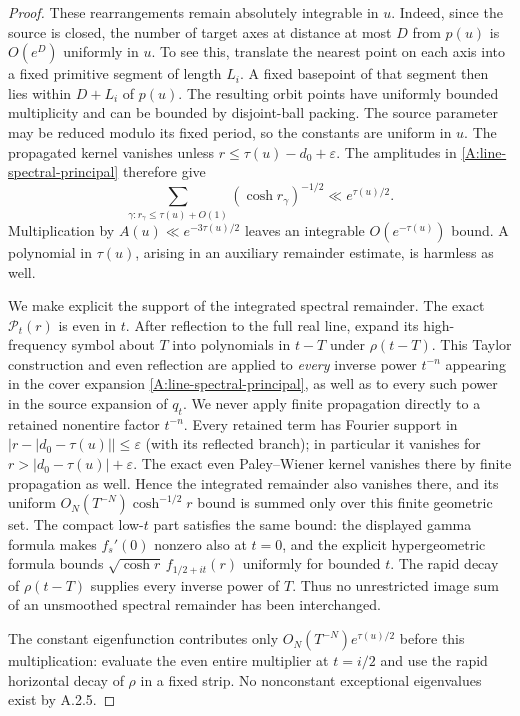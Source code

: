 \begin{proof}
These rearrangements remain absolutely integrable in $u$.
Indeed, since the source is closed, the number of target axes at
distance at most $D$ from $p(u)$ is $O(e^D)$ uniformly in $u$.
To see this, translate the nearest point on each axis into a fixed
primitive segment of length $L_i$. A fixed basepoint of that segment
then lies within $D+L_i$ of $p(u)$. The resulting orbit points have
uniformly bounded multiplicity and can be bounded by disjoint-ball
packing. The source parameter may be reduced modulo its fixed period,
so the constants are uniform in $u$.
The propagated kernel vanishes unless
$r\leq\tau(u)-d_0+\varepsilon$.
The amplitudes in \eqref{A:line-spectral-principal} therefore give
\[
 \sum_{\gamma:r_\gamma\leq\tau(u)+O(1)}
       (\cosh r_\gamma)^{-1/2}
       \ll e^{\tau(u)/2}.
\]
Multiplication by $A(u)\ll e^{-3\tau(u)/2}$ leaves an integrable
$O(e^{-\tau(u)})$ bound.
A polynomial in $\tau(u)$, arising in an auxiliary remainder
estimate, is harmless as well.

We make explicit the support of the integrated spectral remainder.
The exact $\mathcal P_t(r)$ is even in $t$.
After reflection to the full real line, expand its high-frequency
symbol about $T$ into polynomials in $t-T$ under $\rho(t-T)$.
This Taylor construction and even reflection are applied to
\emph{every} inverse power $t^{-n}$ appearing in the cover
expansion \eqref{A:line-spectral-principal}, as well as to every
such power in the source expansion of $q_t$.
We never apply finite propagation directly to a retained
nonentire factor $t^{-n}$.
Every retained term has Fourier support in
$|r-|d_0-\tau(u)||\leq\varepsilon$ (with its reflected branch);
in particular it vanishes for
$r>|d_0-\tau(u)|+\varepsilon$.
The exact even Paley--Wiener kernel vanishes there by finite
propagation as well. Hence the integrated remainder also vanishes
there, and its uniform
$O_N(T^{-N})\cosh^{-1/2}r$ bound is summed only over this finite
geometric set. The compact low-$t$ part satisfies the same bound:
the displayed gamma formula makes $f_s'(0)$ nonzero also at $t=0$,
and the explicit hypergeometric formula bounds
$\sqrt{\cosh r}\,f_{1/2+it}(r)$ uniformly for bounded $t$.
The rapid decay of $\rho(t-T)$ supplies every inverse power of $T$.
Thus no unrestricted image sum of an unsmoothed spectral remainder
has been interchanged.

The constant eigenfunction contributes only
$O_N(T^{-N})e^{\tau(u)/2}$ before this multiplication:
evaluate the even entire multiplier at $t=i/2$ and use the
rapid horizontal decay of $\rho$ in a fixed strip.
No nonconstant exceptional eigenvalues exist by A.2.5.


\end{proof}
